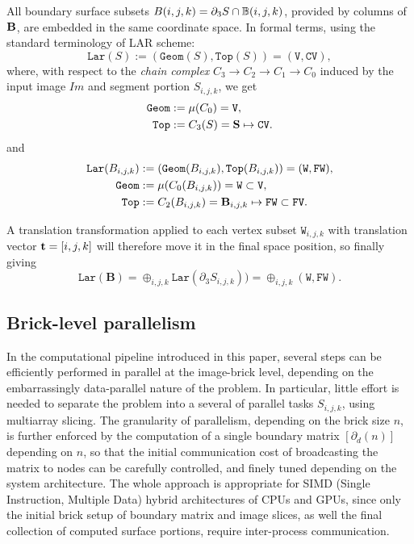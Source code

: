 All boundary surface subsets $B(i,j,k) = \partial_3 S \cap \mathbb{B}(i,j,k)$, provided by  columns of ${\bf B}$, are embedded in the same coordinate space. In formal terms, using the standard terminology of LAR scheme: 
\[
\texttt{Lar}(S) := (\texttt{Geom}(S), \texttt{Top}(S)) = (\texttt{V}, \texttt{CV}),
\]
where, with respect to the \emph{chain complex} $C_3\to C_2\to C_1\to C_0$ induced by the input image $Im$ and segment portion $S_{i,j,k}$, we get
\begin{align}
\texttt{Geom} &:= \mu(C_0) = \texttt{V},
\\
\texttt{Top} &:= C_3(S) = {\bf S} \mapsto \texttt{CV}.
\end{align}
and
\begin{align}
\texttt{Lar}(B_{i,j,k}) &:= (\texttt{Geom}(B_{i,j,k}), \texttt{Top}(B_{i,j,k})) = (\texttt{W}, \texttt{FW}),
\\
\texttt{Geom} &:= \mu(C_0(B_{i,j,k})) = \texttt{W} \subset \texttt{V},
\\
\texttt{Top} &:= C_2(B_{i,j,k}) = {\bf \textbf{B}}_{i,j,k} \mapsto \texttt{FW} \subset \texttt{FV}.
\end{align}


A translation transformation applied to each vertex subset $\texttt{W}_{i,j,k}$ with translation  vector ${\bf t} = [i,j,k]$ will therefore move it in the final space position, so finally giving
\[
\texttt{Lar}(\textbf{B}) = \oplus_{i,j,k}\texttt{Lar}(\partial_3 S_{i,j,k})) = \oplus_{i,j,k}(\texttt{W}, \texttt{FW}) .
\]


\subsection{Brick-level parallelism}\label{sec:brick-parallelism}
In the computational pipeline introduced in this paper, several steps can be efficiently performed in parallel at the image-brick level, depending on the embarrassingly data-parallel nature of the problem. In particular, little effort is needed to separate the problem into a several of parallel tasks $S_{i,j,k}$, using multiarray slicing. The granularity of parallelism, depending on the brick size $n$, is further enforced by the computation of a single boundary matrix $[\partial_d(n)]$ depending on $n$, so that the initial communication cost of broadcasting the matrix to nodes can be carefully controlled, and finely tuned depending on the system architecture. The whole approach is appropriate  for SIMD (Single Instruction, Multiple Data) hybrid architectures of CPUs and GPUs, since only the initial brick setup of boundary matrix and image slices, as well the final collection of computed surface portions, require inter-process communication.